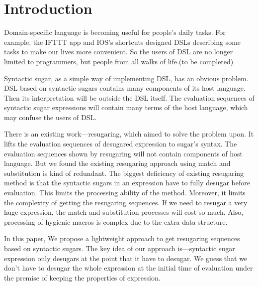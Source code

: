 \section{Introduction}







Domain-specific language\cite{dsl} is becoming useful for people's daily tasks. For example, the IFTTT app and IOS's shortcuts designed DSLs describing some tasks to make our lives more convenient. So the users of DSL are no longer limited to programmers, but people from all walks of life.(to be completed)

Syntactic sugar\cite{syntacticsugar}, as a simple way of implementing DSL, has an obvious problem. DSL based on syntactic sugars contains many components of its host language. Then its interpretation will be outside the DSL itself. The evaluation sequences of syntactic sugar expressions will contain many terms of the host language, which may confuse the users of DSL.

There is an existing work---resugaring\cite{resugaring}\cite{hygienic}, which aimed to solve the problem upon. It lifts the evaluation sequences of desugared expression to sugar's syntax. The evaluation sequences shown by resugaring will not contain components of host language. But we found the existing resugaring approach using match and substitution is kind of redundant. The biggest deficiency of existing resugaring method is that the syntactic sugars in an expression have to fully desugar before evaluation. This limits the processing ability of the method. Moreover, it limits the complexity of getting the resugaring sequences. If we need to resugar a very huge expression, the match and substitution processes will cost so much. Also, processing of hygienic macros is complex due to the extra data structure.

In this paper, We propose a lightweight approach to get resugaring sequences based on syntactic sugars. The key idea of our approach is---syntactic sugar expression only desugars at the point that it have to desugar. We guess that we don't have to desugar the whole expression at the initial time of evaluation under the premise of keeping the properties of expression. 

